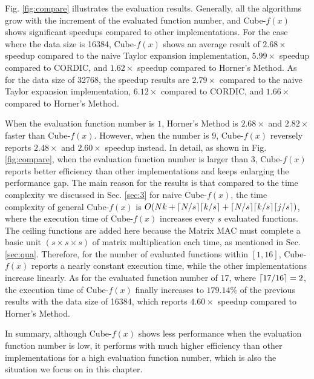 \documentclass[12pt]{extbook}
\DeclarePairedDelimiter\ceil{\lceil}{\rceil}
\begin{document}
Fig. \ref{fig:compare} illustrates the evaluation results. Generally, all the algorithms grow with the increment of the evaluated function number, and Cube-$f(x)$ shows significant speedups compared to other implementations. For the case where the data size is 16384, Cube-$f(x)$ shows an average result of $2.68\times$ speedup compared to the naive Taylor expansion implementation, $5.99\times$ speedup compared to CORDIC, and $1.62\times$ speedup compared to Horner's Method. As for the data size of 32768, the speedup results are $2.79\times$ compared to the naive Taylor expansion implementation, $6.12\times$ compared to CORDIC, and $1.66\times$ compared to Horner's Method. 

When the evaluation function number is $1$, Horner's Method is $2.68\times$ and $2.82\times$ faster than Cube-$f(x)$. However, when the number is $9$, Cube-$f(x)$ reversely reports $2.48\times$ and $2.60\times$ speedup instead. In detail, as shown in Fig. \ref{fig:compare}, when the evaluation function number is larger than 3, Cube-$f(x)$ reports better efficiency than other implementations and keeps enlarging the performance gap. The main reason for the results is that compared to the time complexity we discussed in Sec. \ref{sec:3} for naive Cube-$f(x)$, the time complexity of general Cube-$f(x)$ is $O(Nk + \ceil{N / s} \ceil{k / s} + \ceil{N / s} \ceil{k / s} \ceil{j / s})$, where the execution time of Cube-$f(x)$ increases every $s$ evaluated functions. The ceiling functions are added here because the Matrix MAC must complete a basic unit $(s \times s \times s)$ of matrix multiplication each time, as mentioned in Sec. \ref{sec:qua}. Therefore, for the number of evaluated functions within $[1, 16]$, Cube-$f(x)$ reports a nearly constant execution time, while the other implementations increase linearly. As for the evaluated function number of 17, where $\ceil{17 / 16} = 2$, the execution time of Cube-$f(x)$ finally increases to $179.14\%$ of the previous results with the data size of 16384, which reports $4.60\times$ speedup compared to Horner's Method. 

In summary, although Cube-$f(x)$ shows less performance when the evaluation function number is low, it performs with much higher efficiency than other implementations for a high evaluation function number, which is also the situation we focus on in this chapter.
\end{document}
